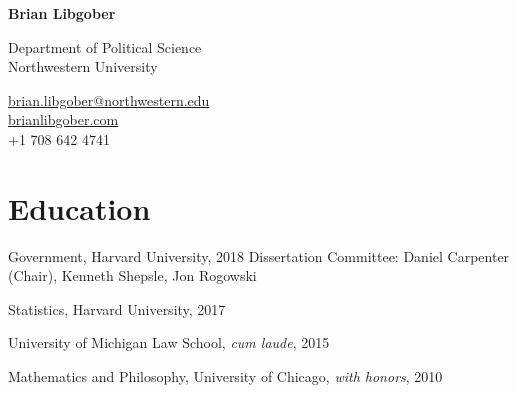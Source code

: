 \documentclass[12pt,letterpaper]{report}
\newcommand{\myname}{Brian Libgober}
\newcommand{\namefont}[1]{{\normalfont\bfseries\Huge{#1}}}
\begin{document}
	\pagestyle{fancy}
	\fancyhf{}
    \fancyfoot[C]{\thepage}  %
    \renewcommand{\footrulewidth}{0pt}  %
	\renewcommand{\headrulewidth}{0pt}
    \raggedright{}

    \begin{minipage}[t]{0.6\textwidth}
	\raggedright{}
    \namefont{\myname}
	\end{minipage}
	\hfill
    \vspace{1em}
    \begin{minipage}[t]{0.6\textwidth}
        \flushleft{} Department of Political Science \\
         Northwestern University
    \end{minipage}
    \hfill
    \begin{minipage}[t]{0.395\textwidth}
        \flushright{}
        \href{mailto:brian.libgober@northwestern.edu}{brian.libgober@northwestern.edu} \\
        \href{https://brianlibgober.com}{brianlibgober.com} \\
         +1 708 642 4741 \\
    \end{minipage}

    \section*{Education}

    \begin{tablist}
        \item[Ph.D.] \tab{}Government, Harvard University, 2018 \newline Dissertation Committee: Daniel Carpenter (Chair), Kenneth Shepsle, Jon Rogowski
        \item[M.A.]  \tab{}Statistics, Harvard University, 2017
        \item[J.D.]  \tab{}University of Michigan Law School, \textit{cum laude}, 2015
        \item[B.A.]  \tab{}Mathematics and Philosophy, University of Chicago, \textit{with honors}, 2010

    \end{tablist}
\end{document}
